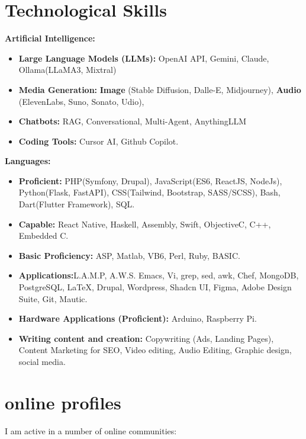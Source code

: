 \documentclass[]{friggeri-cv} %
\begin{document}
\section{Technological Skills}
\textbf{Artificial Intelligence:}
\begin{itemize}
\item \textbf{Large Language Models (LLMs): } OpenAI API, Gemini, Claude, Ollama(LLaMA3, Mixtral)
\item \textbf{Media Generation:} \textbf{Image} (Stable Diffusion, Dalle-E, Midjourney), \textbf{Audio} (ElevenLabs, Suno, Sonato, Udio),
\item \textbf{Chatbots:} RAG, Conversational, Multi-Agent, AnythingLLM
\item \textbf{Coding Tools:} Cursor AI, Github Copilot.
\end{itemize}
\textbf{Languages:}
\begin{itemize}
\item \textbf{Proficient: }PHP(Symfony, Drupal), JavaScript(ES6, ReactJS, NodeJs), Python(Flask, FastAPI), CSS(Tailwind, Bootstrap, SASS/SCSS), Bash, Dart(Flutter Framework), SQL.
\item \textbf{Capable: } React Native, Haskell, Assembly, Swift, Objective\-C, C++, Embedded C.
\item \textbf{Basic Proficiency: }ASP, Matlab, VB6, Perl, Ruby, BASIC.
\item \textbf{Applications:}L.A.M.P, A.W.S. Emacs, Vi, grep, sed, awk, Chef, MongoDB, PostgreSQL, \LaTeX, Drupal, Wordpress, Shadcn UI, Figma, Adobe Design Suite, Git, Mautic.
\item \textbf{Hardware Applications (Proficient):} Arduino, Raspberry Pi.
\item \textbf{Writing content and creation:} Copywriting (Ads, Landing Pages), Content Marketing for SEO, Video editing, Audio Editing, Graphic design, social media.
\end{itemize}


\section{online profiles}
I am active in a number of online communities:
\end{document}

